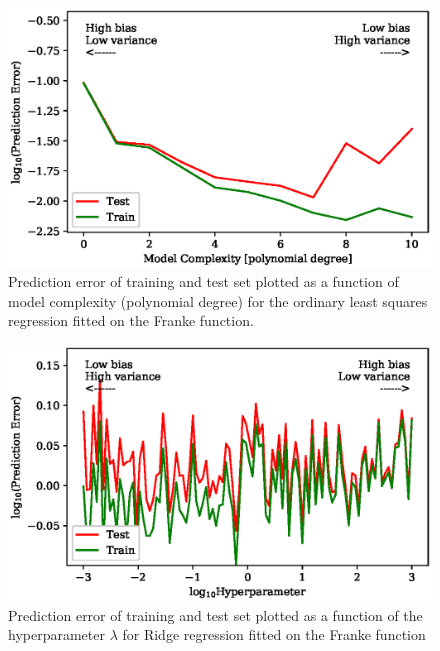 \documentclass[a4paper, 10pt]{article}
\begin{document}
\begin{figure}[H]
    \includegraphics[scale=1]{figs/biasvariancetradeoff_ols_Franke.eps}
    \caption{Prediction error of training and test set plotted as a function of model complexity (polynomial degree) for the ordinary least squares regression fitted on the Franke function.}
    \label{fig:bias_ols_Franke}
\end{figure}
    
\begin{figure}[H]
    \includegraphics{figs/biasvariancetradeoff_Ridge_Franke.eps}
    \caption{Prediction error of training and test set plotted as a function of the hyperparameter $\lambda$ for Ridge regression fitted on the Franke function}
    \label{fig:bias_ridge_Franke}
\end{figure}    
\end{document}
